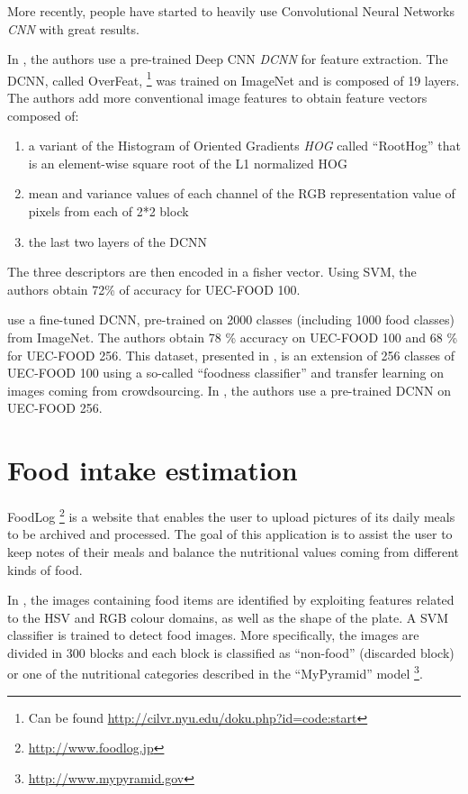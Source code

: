 
More recently, people have started to heavily use Convolutional Neural Networks \textit{CNN} with great results.

In \cite{Kawano2014}, the authors use a pre-trained Deep CNN \textit{DCNN} for feature extraction. The DCNN, called OverFeat, \footnote{Can be found \url{http://cilvr.nyu.edu/doku.php?id=code:start}} was trained on ImageNet and is composed of 19 layers. The authors add more conventional image features to obtain feature vectors composed of: 
\begin{enumerate}
    \item a variant of the Histogram of Oriented Gradients \textit{HOG} called \enquote{RootHog} that is an element-wise square root of the L1 normalized HOG
    \item mean and variance values of each channel of the RGB representation value of pixels from each of 2*2  block
    \item the last two layers of the DCNN
\end{enumerate}
The three descriptors are then encoded in a fisher vector. Using SVM, the authors obtain 72\% of accuracy for UEC-FOOD 100.

\cite{Yanai2015} use a fine-tuned DCNN, pre-trained on 2000 classes (including 1000 food classes) from ImageNet. The authors obtain 78 \% accuracy on UEC-FOOD 100 and 68 \% for UEC-FOOD 256. This dataset, presented in \cite{Kawano2015}, is an extension of 256 classes of UEC-FOOD 100 using a so-called \enquote{foodness classifier} and transfer learning on images coming from crowdsourcing.
In \cite{Bolanos2016}, the authors use a pre-trained DCNN on UEC-FOOD 256.

\section{Food intake estimation}


FoodLog \footnote{\url{http://www.foodlog.jp}} is a website that enables the user to upload pictures of its daily meals to be archived and processed. The goal of this application is to assist the user to keep notes of their meals and balance the nutritional values coming from different kinds of food.

In \cite{Kitamura2008}, the images containing food items are identified by exploiting features related to the HSV and RGB colour domains, as well as the shape of the plate. A SVM classifier is trained to detect food images. More specifically, the images are divided in 300 blocks and each block is classified as \enquote{non-food} (discarded block) or one of the nutritional categories described in the \enquote{MyPyramid} model \footnote{\url{http://www.mypyramid.gov}}.


